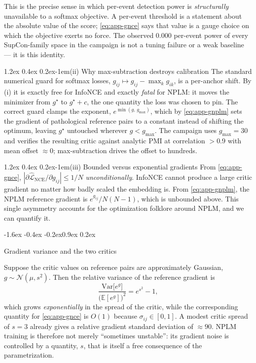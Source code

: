 \documentclass{article}
\makeatletter
\renewcommand\subsection{\@startsection{subsection}{2}{\z@}%
  {-1.6ex \@plus -0.4ex \@minus -0.2ex}{0.9ex \@plus 0.2ex}%
  {\normalsize\bf\raggedright}}
\renewcommand\paragraph{\@startsection{paragraph}{4}{\z@}%
  {1.2ex \@plus 0.4ex \@minus 0.2ex}{-1em}{\normalsize\bf}}
\newcommand{\E}{\mathbb{E}}
\newcommand{\N}{\mathcal{N}}
\makeatother
\begin{document}
This is the precise sense in which per-event detection power is
\emph{structurally} unavailable to a softmax objective. A per-event threshold
is a statement about the absolute value of the score; \eqref{eq:app-gnce} says
that value is a gauge choice on which the objective exerts no force. The
observed $0.000$ per-event power of every SupCon-family space in the campaign
is not a tuning failure or a weak baseline --- it is this identity.

\paragraph{(ii) Why max-subtraction destroys calibration}
The standard numerical guard for softmax losses, $g_{ij}\mapsto
g_{ij}-\max_k g_{ik}$, is a per-anchor shift. By (i) it is exactly free for
InfoNCE and exactly \emph{fatal} for NPLM: it moves the minimizer from
$g^\star$ to $g^\star + c$, the one quantity the loss was chosen to pin. The
correct guard clamps the exponent, $e^{\min(g,\,g_{\max})}$, which by
\eqref{eq:app-gnplm} sets the gradient of pathological reference pairs to a
constant instead of shifting the optimum, leaving $g^\star$ untouched wherever
$g<g_{\max}$. The campaign uses $g_{\max}=30$ and verifies the resulting critic
against analytic PMI at correlation $>0.9$ with mean offset $\approx0$;
max-subtraction drives the offset to hundreds.

\paragraph{(iii) Bounded versus exponential gradients}
From \eqref{eq:app-gnce}, $|\partial\widehat{\mathcal{L}}_{\mathrm{NCE}}/
\partial g_{ij}|\le 1/N$ \emph{unconditionally}. InfoNCE cannot produce a large
critic gradient no matter how badly scaled the embedding is. From
\eqref{eq:app-gnplm}, the NPLM reference gradient is $e^{g_{ij}}/N(N-1)$, which
is unbounded above. This single asymmetry accounts for the optimization
folklore around NPLM, and we can quantify it.

\subsection{Gradient variance and the two critics}
\label{app:variance}

Suppose the critic values on reference pairs are approximately Gaussian,
$g \sim \N(\mu,s^2)$. Then the relative variance of the reference gradient is
\begin{equation}
\frac{\mathrm{Var}\big[e^{g}\big]}{\big(\E[e^{g}]\big)^2}
= e^{s^{2}} - 1 ,
\label{eq:app-var}
\end{equation}
which grows \emph{exponentially} in the spread of the critic, while the
corresponding quantity for \eqref{eq:app-gnce} is $O(1)$ because $\sigma_{ij}
\in[0,1]$. A modest critic spread of $s=3$ already gives a relative gradient
standard deviation of $\approx90$. NPLM training is therefore not merely
``sometimes unstable'': its gradient noise is controlled by a quantity, $s$,
that is itself a free consequence of the parametrization.
\end{document}
